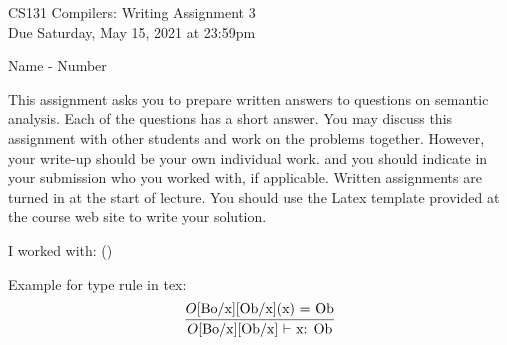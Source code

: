 \documentclass[10pt]{article}
\newcommand{\infertext}[2]{\infer{{\textrm{#1}}}{#2}}
\begin{document}
\begin{center}
\Large CS131 Compilers: Writing Assignment 3\\Due Saturday, May 15, 2021 at 23:59pm
\end{center}

\begin{center}
\LARGE  Name - Number
\end{center}

This assignment asks you to prepare written answers to questions on
semantic analysis. Each of the questions has a short answer. You
may discuss this assignment with other students and work on the problems
together. However, your write-up should be your own individual work.
and you should indicate in your submission who you worked with, if applicable.
Written assignments are turned in at the start of lecture.
You should use the Latex template provided at the course web site to write your solution.

\begin{center}
I worked with: ()
\end{center}

Example for type rule in tex:
\[\infertext
          {$O$[Bo/x][Ob/x] $\vdash$ x: Ob}
          {\textrm{$O$[Bo/x][Ob/x](x) = Ob}}       
\]
\end{document}
